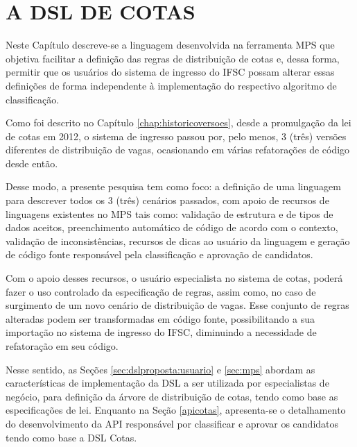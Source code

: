 \chapter{A DSL DE COTAS}
\label{chap:dslcotas}

   Neste Capítulo descreve-se a linguagem desenvolvida na ferramenta \gls{MPS} que objetiva facilitar a definição das regras de distribuição de cotas e, dessa forma, permitir que os usuários do sistema de ingresso do \gls{IFSC} possam alterar essas definições de forma independente à implementação do respectivo algoritmo de classificação.
   
   Como foi descrito no Capítulo \ref{chap:historicoversoes}, desde a promulgação da lei de cotas em 2012, o sistema de ingresso passou por, pelo menos, 3 (três) versões diferentes de distribuição de vagas, ocasionando em várias refatorações de código desde então. 
   
   Desse modo, a presente pesquisa tem como foco: a definição de uma linguagem para descrever todos os 3 (três) cenários passados, com apoio de recursos de linguagens existentes no \gls{MPS} tais como: validação de estrutura e de tipos de dados aceitos, preenchimento automático de código de acordo com o contexto, validação de inconsistências, recursos de dicas ao usuário da linguagem e geração de código fonte responsável pela classificação e aprovação de candidatos. 
   
   Com o apoio desses recursos, o usuário especialista no sistema de cotas, poderá fazer o uso controlado da especificação de regras, assim como, no caso de surgimento de um novo cenário de distribuição de vagas. Esse conjunto de regras alteradas podem ser transformadas em código fonte, possibilitando a  sua importação no sistema de ingresso do \gls{IFSC}, diminuindo a necessidade de refatoração em seu código.
   
   Nesse sentido, as Seções \ref{sec:dslproposta:usuario} e \ref{sec:mps} abordam as características de implementação da \gls{DSL} a ser utilizada por especialistas de negócio, para definição da árvore de distribuição de cotas, tendo como base as especificações de lei. Enquanto na Seção \ref{apicotas}, apresenta-se o detalhamento do desenvolvimento da \gls{API} responsável por classificar e aprovar os candidatos tendo como base a DSL Cotas.
   
  
   

   
 
